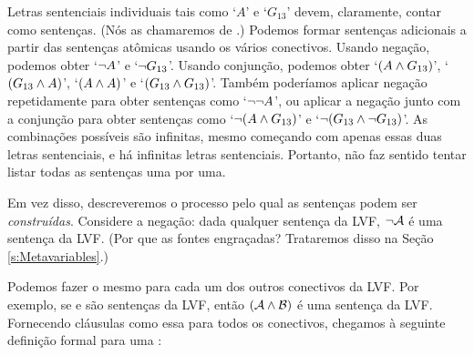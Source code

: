 Letras sentenciais individuais tais como `$A$' e `$G_{13}$' devem, claramente, contar como sentenças.
(Nós as chamaremos de .)
Podemos formar sentenças adicionais a partir das sentenças atômicas usando os vários conectivos.
Usando negação, podemos obter `$\neg A$' e `$\neg G_{13} $'.
Usando conjunção, podemos obter `$(A \wedge G_{13})$', `$(G_{13} \wedge A)$', `$(A \wedge A)$' e `$(G_{13} \wedge G_{13})$'.
Também poderíamos aplicar negação repetidamente para obter sentenças como `$\neg\neg A$', ou aplicar a negação junto com a conjunção para obter sentenças como `$\neg(A \wedge G_{13})$' e `$\neg(G_{13} \wedge \neg G_{13})$'.
As combinações possíveis são infinitas, mesmo começando com apenas essas duas letras sentenciais, e há infinitas letras sentenciais.
Portanto, não faz sentido tentar listar todas as sentenças uma por uma.

Em vez disso, descreveremos o processo pelo qual as sentenças podem ser \emph{construídas}.
Considere a negação: dada qualquer sentença  da LVF, $\neg\mathcal{A}$ é uma sentença da LVF.
(Por que as fontes engraçadas? Trataremos disso na Seção \ref{s:Metavariables}.)

Podemos fazer o mesmo para cada um dos outros conectivos da LVF.
Por exemplo, se  e  são sentenças da LVF, então $(\mathcal{A}\wedge\mathcal{B})$ é uma sentença da LVF.
Fornecendo cláusulas como essa para todos os conectivos, chegamos à seguinte definição formal para uma :
{\small 
	}

